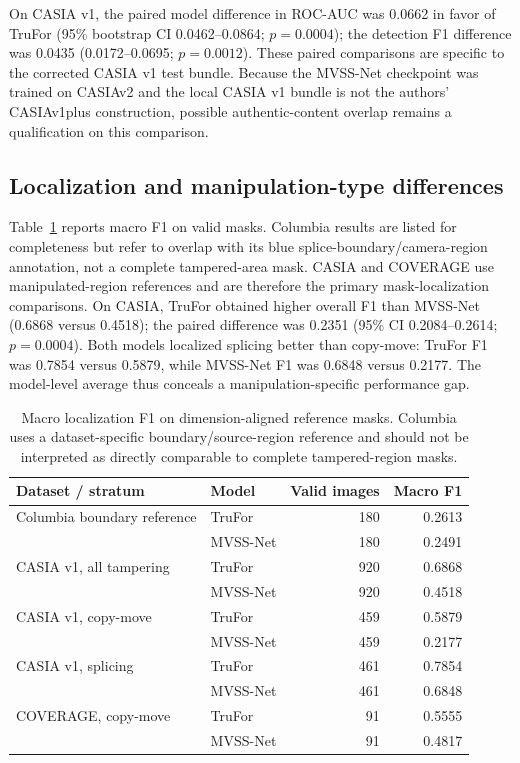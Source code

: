 On CASIA v1, the paired model difference in ROC-AUC was 0.0662 in favor of TruFor (95\% bootstrap CI 0.0462--0.0864; $p=0.0004$); the detection F1 difference was 0.0435 (0.0172--0.0695; $p=0.0012$). These paired comparisons are specific to the corrected CASIA v1 test bundle. Because the MVSS-Net checkpoint was trained on CASIAv2 and the local CASIA v1 bundle is not the authors' CASIAv1plus construction, possible authentic-content overlap remains a qualification on this comparison.

\subsection{Localization and manipulation-type differences}
Table~\ref{tab:localization} reports macro F1 on valid masks. Columbia results are listed for completeness but refer to overlap with its blue splice-boundary/camera-region annotation, not a complete tampered-area mask. CASIA and COVERAGE use manipulated-region references and are therefore the primary mask-localization comparisons. On CASIA, TruFor obtained higher overall F1 than MVSS-Net (0.6868 versus 0.4518); the paired difference was 0.2351 (95\% CI 0.2084--0.2614; $p=0.0004$). Both models localized splicing better than copy-move: TruFor F1 was 0.7854 versus 0.5879, while MVSS-Net F1 was 0.6848 versus 0.2177. The model-level average thus conceals a manipulation-specific performance gap.

\begin{table}[t]
\centering
\caption{Macro localization F1 on dimension-aligned reference masks. Columbia uses a dataset-specific boundary/source-region reference and should not be interpreted as directly comparable to complete tampered-region masks.}
\label{tab:localization}
\small
\begin{tabular}{llrr}
\toprule
Dataset / stratum & Model & Valid images & Macro F1 \\
\midrule
Columbia boundary reference & TruFor & 180 & 0.2613 \\
 & MVSS-Net & 180 & 0.2491 \\
CASIA v1, all tampering & TruFor & 920 & 0.6868 \\
 & MVSS-Net & 920 & 0.4518 \\
CASIA v1, copy-move & TruFor & 459 & 0.5879 \\
 & MVSS-Net & 459 & 0.2177 \\
CASIA v1, splicing & TruFor & 461 & 0.7854 \\
 & MVSS-Net & 461 & 0.6848 \\
COVERAGE, copy-move & TruFor & 91 & 0.5555 \\
 & MVSS-Net & 91 & 0.4817 \\
\bottomrule
\end{tabular}
\end{table}

